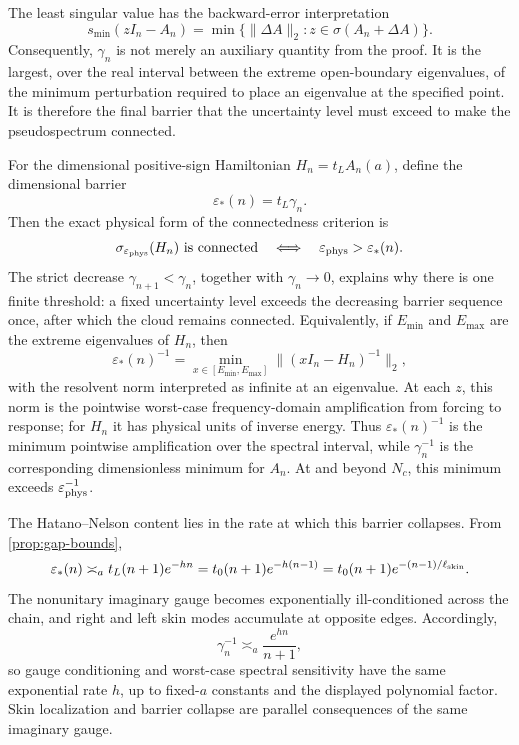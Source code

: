 \documentclass[review,hidelinks,onefignum,onetabnum]{siamart251216}
\begin{document}
The least singular value has the backward-error interpretation
\[
 s_{\min}(zI_n-A_n)
 =\min\{\lVert\Delta A\rVert_2:
 z\in\sigma(A_n+\Delta A)\}.
\]
Consequently, \(\gamma_n\) is not merely an auxiliary quantity from the
proof.  It is the largest, over the real interval between the extreme
open-boundary eigenvalues, of the minimum perturbation required to place an
eigenvalue at the specified point.  It is therefore the final barrier that
the uncertainty level must exceed to make the pseudospectrum connected.

For the dimensional positive-sign Hamiltonian \(H_n=t_LA_n(a)\), define
the dimensional barrier
\[
 \varepsilon_*(n)=t_L\gamma_n.
\]
Then the exact physical form of the connectedness criterion is
\[
 \sigma_{\varepsilon_{\rm phys}}(H_n)\text{ is connected}
 \quad\Longleftrightarrow\quad
 \varepsilon_{\rm phys}>\varepsilon_*(n).
\]
The strict decrease \(\gamma_{n+1}<\gamma_n\), together with
\(\gamma_n\to0\), explains why there is one finite threshold: a fixed
uncertainty level exceeds the decreasing barrier sequence once, after which
the cloud remains connected.  Equivalently, if
\(E_{\min}\) and \(E_{\max}\) are the extreme eigenvalues of \(H_n\), then
\[
 \varepsilon_*(n)^{-1}
 =\min_{x\in[E_{\min},E_{\max}]}
 \lVert(xI_n-H_n)^{-1}\rVert_2,
\]
with the resolvent norm interpreted as infinite at an eigenvalue.  At each
\(z\), this norm is the pointwise worst-case frequency-domain amplification
from forcing to response; for \(H_n\) it has physical units of inverse
energy.  Thus \(\varepsilon_*(n)^{-1}\) is the minimum pointwise amplification
over the spectral interval, while \(\gamma_n^{-1}\) is the corresponding
dimensionless minimum for \(A_n\).  At and beyond \(N_c\), this minimum
exceeds \(\varepsilon_{\rm phys}^{-1}\).

The Hatano--Nelson content lies in the rate at which this barrier collapses.
From \cref{prop:gap-bounds},
\[
 \varepsilon_*(n)
 \asymp_a t_L(n+1)e^{-hn}
 =t_0(n+1)e^{-h(n-1)}
 =t_0(n+1)e^{-(n-1)/\ell_{\rm skin}}.
\]
The nonunitary imaginary gauge becomes exponentially ill-conditioned across
the chain, and right and left skin modes accumulate at opposite edges.
Accordingly,
\[
 \gamma_n^{-1}\asymp_a\frac{e^{hn}}{n+1},
\]
so gauge conditioning and worst-case spectral sensitivity have the same
exponential rate \(h\), up to fixed-\(a\) constants and the displayed
polynomial factor.  Skin localization and barrier collapse are parallel
consequences of the same imaginary gauge.
\end{document}
